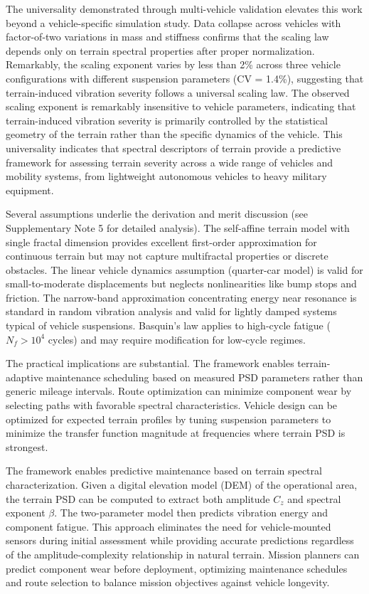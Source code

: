 \documentclass[11pt,letterpaper]{article}
\begin{document}
The universality demonstrated through multi-vehicle validation elevates this work beyond a vehicle-specific simulation study. Data collapse across vehicles with factor-of-two variations in mass and stiffness confirms that the scaling law depends only on terrain spectral properties after proper normalization. Remarkably, the scaling exponent varies by less than 2\% across three vehicle configurations with different suspension parameters (CV = 1.4\%), suggesting that terrain-induced vibration severity follows a universal scaling law. The observed scaling exponent is remarkably insensitive to vehicle parameters, indicating that terrain-induced vibration severity is primarily controlled by the statistical geometry of the terrain rather than the specific dynamics of the vehicle. This universality indicates that spectral descriptors of terrain provide a predictive framework for assessing terrain severity across a wide range of vehicles and mobility systems, from lightweight autonomous vehicles to heavy military equipment.

Several assumptions underlie the derivation and merit discussion (see Supplementary Note 5 for detailed analysis). The self-affine terrain model with single fractal dimension provides excellent first-order approximation for continuous terrain but may not capture multifractal properties or discrete obstacles\cite{Persson2005}. The linear vehicle dynamics assumption (quarter-car model) is valid for small-to-moderate displacements but neglects nonlinearities like bump stops and friction\cite{Wong2022,Gillespie1992}. The narrow-band approximation concentrating energy near resonance is standard in random vibration analysis\cite{Miles1954,Bendat2010} and valid for lightly damped systems typical of vehicle suspensions. Basquin's law applies to high-cycle fatigue ($N_f > 10^4$ cycles) and may require modification for low-cycle regimes\cite{Dowling2013}.


The practical implications are substantial. The framework enables terrain-adaptive maintenance scheduling based on measured PSD parameters rather than generic mileage intervals. Route optimization can minimize component wear by selecting paths with favorable spectral characteristics. Vehicle design can be optimized for expected terrain profiles by tuning suspension parameters to minimize the transfer function magnitude at frequencies where terrain PSD is strongest.

The framework enables predictive maintenance based on terrain spectral characterization. Given a digital elevation model (DEM) of the operational area, the terrain PSD can be computed to extract both amplitude $C_z$ and spectral exponent $\beta$. The two-parameter model then predicts vibration energy and component fatigue. This approach eliminates the need for vehicle-mounted sensors during initial assessment while providing accurate predictions regardless of the amplitude-complexity relationship in natural terrain. Mission planners can predict component wear before deployment, optimizing maintenance schedules and route selection to balance mission objectives against vehicle longevity.
\end{document}
